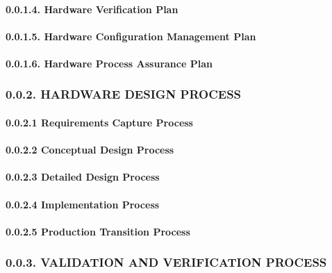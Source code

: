 \documentclass[]{article}
\let\oldparagraph\paragraph
\renewcommand{\paragraph}[1]{\oldparagraph{#1}\mbox{}}
\begin{document}
\paragraph{0.0.1.4. Hardware Verification
Plan}\label{hardware-verification-plan}

\paragraph{0.0.1.5. Hardware Configuration Management
Plan}\label{hardware-configuration-management-plan}

\paragraph{0.0.1.6. Hardware Process Assurance
Plan}\label{hardware-process-assurance-plan}

\subsubsection{0.0.2. HARDWARE DESIGN
PROCESS}\label{hardware-design-process}

\paragraph{0.0.2.1 Requirements Capture
Process}\label{requirements-capture-process}

\paragraph{0.0.2.2 Conceptual Design
Process}\label{conceptual-design-process}

\paragraph{0.0.2.3 Detailed Design
Process}\label{detailed-design-process}

\paragraph{0.0.2.4 Implementation Process}\label{implementation-process}

\paragraph{0.0.2.5 Production Transition
Process}\label{production-transition-process}

\subsubsection{0.0.3. VALIDATION AND VERIFICATION
PROCESS}\label{validation-and-verification-process}
\end{document}
